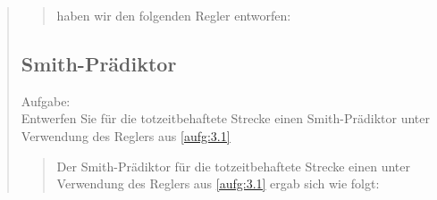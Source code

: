 \begin{quote}
    \begin{quote}
        
        haben wir den folgenden Regler entworfen:
        
        
        
    \end{quote}
    
    
    
    \subsection{Smith-Prädiktor}
    Aufgabe:\\
    Entwerfen Sie für die totzeitbehaftete Strecke einen Smith-Prädiktor unter Verwendung des Reglers aus
    \ref{aufg:3.1}\vspace{1em}
    
    
    \begin{quote}
        
        Der Smith-Prädiktor für die totzeitbehaftete Strecke einen unter Verwendung des Reglers aus \ref{aufg:3.1} ergab sich wie folgt:
        
        
    \end{quote}
    
\end{quote} %



